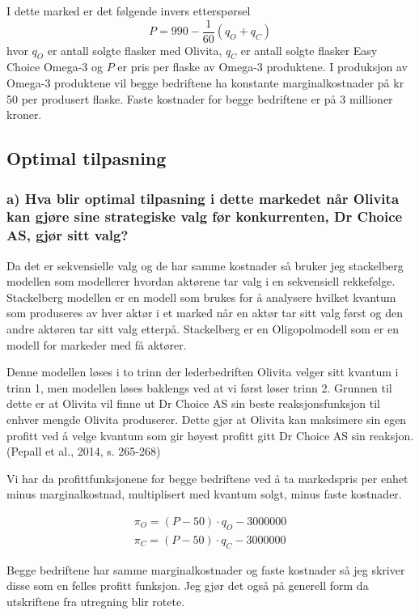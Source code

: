 \documentclass[
  12pt,
  a4paper,
  DIV=11,
  numbers=noendperiod]{scrartcl}
\begin{document}
I dette marked er det følgende invers etterspørsel \[
P = 990 - \frac{1}{60}(q_O + q_C)
\] hvor \(q_O\) er antall solgte flasker med Olivita, \(q_C\) er antall
solgte flasker Easy Choice Omega-3 og \(P\) er pris per flaske av
Omega-3 produktene. I produksjon av Omega-3 produktene vil begge
bedriftene ha konstante marginalkostnader på kr 50 per produsert flaske.
Faste kostnader for begge bedriftene er på 3 millioner kroner.

\subsection{Optimal tilpasning}\label{optimal-tilpasning}

\subsubsection{a) Hva blir optimal tilpasning i dette markedet når Olivita kan gjøre sine strategiske valg før konkurrenten, Dr Choice AS, gjør sitt valg?}\label{a-hva-blir-optimal-tilpasning-i-dette-markedet-nuxe5r-olivita-kan-gjuxf8re-sine-strategiske-valg-fuxf8r}

Da det er sekvensielle valg og de har samme kostnader så bruker jeg
stackelberg modellen som modellerer hvordan aktørene tar valg i en
sekvensiell rekkefølge. Stackelberg modellen er en modell som brukes for
å analysere hvilket kvantum som produseres av hver aktør i et marked når
en aktør tar sitt valg først og den andre aktøren tar sitt valg etterpå.
Stackelberg er en Oligopolmodell som er en modell for markeder med få
aktører.

Denne modellen løses i to trinn der lederbedriften Olivita velger sitt
kvantum i trinn 1, men modellen løses baklengs ved at vi først løser
trinn 2. Grunnen til dette er at Olivita vil finne ut Dr Choice AS sin
beste reaksjonsfunksjon til enhver mengde Olivita produserer. Dette gjør
at Olivita kan maksimere sin egen profitt ved å velge kvantum som gir
høyest profitt gitt Dr Choice AS sin reaksjon. (Pepall et al., 2014, s.
265-268)

Vi har da profittfunksjonene for begge bedriftene ved å ta markedspris
per enhet minus marginalkostnad, multiplisert med kvantum solgt, minus
faste kostnader.

\begin{align*}
\pi_O=(P-50) \cdot q_O-3000000 \\
\pi_C=(P-50) \cdot q_C-3000000
\end{align*}

Begge bedriftene har samme marginalkostnader og faste kostnader så jeg
skriver disse som en felles profitt funksjon. Jeg gjør det også på
generell form da utskriftene fra utregning blir rotete.
\end{document}
